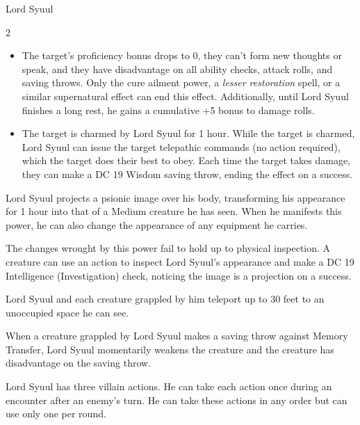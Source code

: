 \documentclass[10pt,a4paper,twoside,bg=print,twocolumn,openany,nodeprecatedcode]{dndbook}
\begin{document}
\begin{DndMonster}[float*=b,width=\textwidth + 8pt]{Lord Syuul}
\begin{multicols}{2}
\begin{itemize}
\item The target's proficiency bonus drops to 0, they can't form new thoughts or speak, and they have disadvantage on all ability checks, attack rolls, and saving throws. Only the cure ailment power, a \textit{lesser restoration} spell, or a similar supernatural effect can end this effect. Additionally, until Lord Syuul finishes a long rest, he gains a cumulative +5 bonus to damage rolls.
\item The target is charmed by Lord Syuul for 1 hour. While the target is charmed, Lord Syuul can issue the target telepathic commands (no action required), which the target does their best to obey. Each time the target takes damage, they can make a DC 19 Wisdom saving throw, ending the effect on a success.
\end{itemize}

Lord Syuul projects a psionic image over his body, transforming his appearance for 1 hour into that of a Medium creature he has seen. When he manifests this power, he can also change the appearance of any equipment he carries.

The changes wrought by this power fail to hold up to physical inspection. A creature can use an action to inspect Lord Syuul's appearance and make a DC 19 Intelligence (Investigation) check, noticing the image is a projection on a success.

Lord Syuul and each creature grappled by him teleport up to 30 feet to an unoccupied space he can see.

When a creature grappled by Lord Syuul makes a saving throw against Memory Transfer, Lord Syuul momentarily weakens the creature and the creature has disadvantage on the saving throw.

Lord Syuul has three villain actions. He can take each action once during an encounter after an enemy's turn. He can take these actions in any order but can use only one per round.


\end{multicols}
\end{DndMonster}
\end{document}
